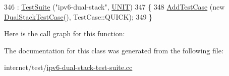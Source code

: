 \begin{DoxyCode}
346     : \hyperlink{classns3_1_1TestSuite_a904b0c40583b744d30908aeb94636d1a}{TestSuite} (\textcolor{stringliteral}{"ipv6-dual-stack"}, \hyperlink{classns3_1_1TestSuite_a1ebfcab34ec8161e085e8e3a1855eae0a3885375a3787abf60431f8454b3cadbd}{UNIT})
347   \{
348     \hyperlink{classns3_1_1TestCase_a3718088e3eefd5d6454569d2e0ddd835}{AddTestCase} (\textcolor{keyword}{new} \hyperlink{classDualStackTestCase}{DualStackTestCase}(), TestCase::QUICK);
349   \}
\end{DoxyCode}


Here is the call graph for this function\+:




The documentation for this class was generated from the following file\+:\begin{DoxyCompactItemize}
\item 
internet/test/\hyperlink{ipv6-dual-stack-test-suite_8cc}{ipv6-\/dual-\/stack-\/test-\/suite.\+cc}\end{DoxyCompactItemize}
